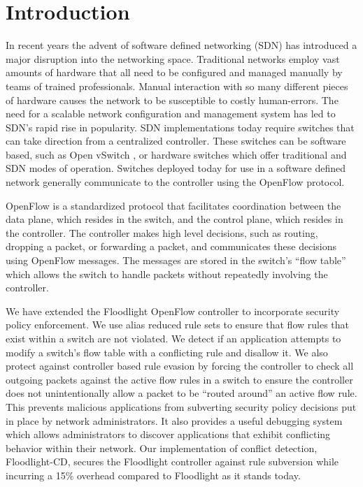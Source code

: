 \section{Introduction}
\label{sec:intro}

In recent years the advent of software defined networking (SDN) has introduced a major disruption into the networking space.
Traditional networks employ vast amounts of hardware that all need to be configured and managed manually by teams of trained professionals.
Manual interaction with so many different pieces of hardware causes the network to be susceptible to costly human-errors. 
The need for a scalable network configuration and management system has led to SDN's rapid rise in popularity.
SDN implementations today require switches that can take direction from a centralized controller.
These switches can be software based, such as Open vSwitch \cite{DBLP:conf/hotnets/PfaffPACKS09}, or hardware switches which offer traditional and SDN modes of operation.
Switches deployed today for use in a software defined network generally communicate to the controller using the OpenFlow protocol.

OpenFlow \cite{McKeown:2008:OEI:1355734.1355746} is a standardized protocol that facilitates coordination between the data plane, which resides in the switch, and the control plane, which resides in the controller.
The controller makes high level decisions, such as routing, dropping a packet, or forwarding a packet, and communicates these decisions using OpenFlow messages.
The messages are stored in the switch's ``flow table'' which allows the switch to handle packets without repeatedly involving the controller. 


We have extended the Floodlight OpenFlow controller \cite{floodlight} to incorporate security policy enforcement.
We use alias reduced rule sets to ensure that flow rules that exist within a switch are not violated.
We detect if an application attempts to modify a switch's flow table with a conflicting rule and disallow it.
We also protect against controller based rule evasion by forcing the controller to check all outgoing packets against the active flow rules in a switch to ensure the controller does not unintentionally allow a packet to be ``routed around'' an active flow rule.
This prevents malicious applications from subverting security policy decisions put in place by network administrators.
It also provides a useful debugging system which allows administrators to discover applications that exhibit conflicting behavior within their network.
Our implementation of conflict detection, Floodlight-CD, secures the Floodlight controller against rule subversion while incurring a 15\% overhead compared to Floodlight as it stands today. 

